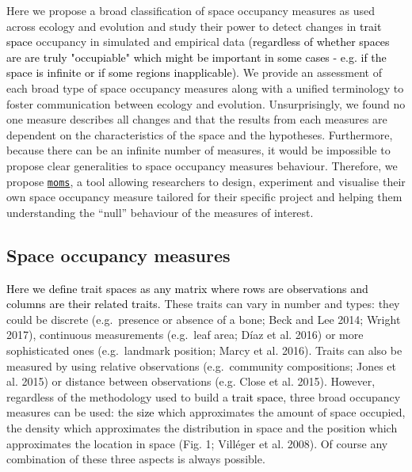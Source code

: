 \documentclass[]{article}
\begin{document}
Here we propose a broad classification of space occupancy measures as
used across ecology and evolution and study their power to detect
changes in \textcolor{black}{trait space} occupancy in
simulated and empirical data
(\textcolor{black}{regardless of whether spaces are are truly "occupiable" which might be important in some cases - e.g. if the space is infinite or if some regions inapplicable)}.
We provide an assessment of each broad type of space occupancy measures
along with a unified terminology to foster communication between ecology
and evolution. Unsurprisingly, we found no one measure describes all
changes and that the results from each measures are dependent on the
characteristics of the space and the hypotheses. Furthermore, because
there can be an infinite number of measures, it would be impossible to
propose clear generalities to space occupancy measures behaviour.
Therefore, we propose
\href{https://tguillerme.shinyapps.io/moms/}{\texttt{moms}}, a tool
allowing researchers to design, experiment and visualise their own space
occupancy measure tailored for their specific project and helping them
understanding the ``null'' behaviour of the measures of interest.

\subsection{Space occupancy measures}\label{space-occupancy-measures}

\textcolor{black}{Here we define trait spaces as any matrix where rows are observations and columns are their related traits.}
These traits can vary in number and types: they could be discrete
(e.g.~presence or absence of a bone; Beck and Lee 2014; Wright 2017),
continuous measurements (e.g.~leaf area; Díaz et al. 2016) or more
sophisticated ones (e.g.~landmark position; Marcy et al. 2016). Traits
can also be measured by using relative observations (e.g.~community
compositions; Jones et al. 2015) or distance between observations (e.g.
Close et al. 2015). However, regardless of the methodology used to build
a \textcolor{black}{trait space}, three broad occupancy
measures can be used: the \textcolor{black}{size} which
approximates the amount of space occupied, the density which
approximates the distribution in space and the position which
approximates the location in space (Fig. 1; Villéger et al. 2008). Of
course any combination of these three aspects is always possible.

\renewcommand\baselinestretch{1}\selectfont
\end{document}
